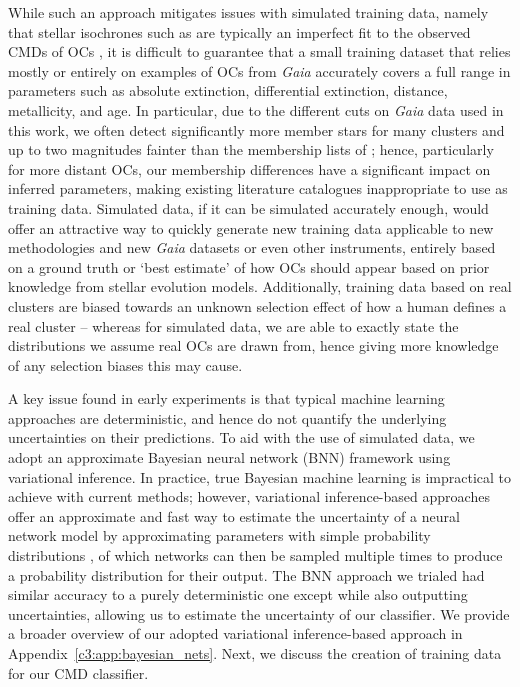 While such an approach mitigates issues with simulated training data, namely that stellar isochrones such as \cite{bressan_parsec_2012} are typically an imperfect fit to the observed CMDs of OCs \citep{cantat-gaudin_painting_2020}, it is difficult to guarantee that a small training dataset that relies mostly or entirely on examples of OCs from \emph{Gaia} accurately covers a full range in parameters such as absolute extinction, differential extinction, distance, metallicity, and age. In particular, due to the different cuts on \emph{Gaia} data used in this work, we often detect significantly more member stars for many clusters and up to two magnitudes fainter than the membership lists of \cite{cantat-gaudin_clusters_2020}; hence, particularly for more distant OCs, our membership differences have a significant impact on inferred parameters, making existing literature catalogues inappropriate to use as training data. Simulated data, if it can be simulated accurately enough, would offer an attractive way to quickly generate new training data applicable to new methodologies and new \emph{Gaia} datasets or even other instruments, entirely based on a ground truth or `best estimate' of how OCs should appear based on prior knowledge from stellar evolution models. Additionally, training data based on real clusters are biased towards an unknown selection effect of how a human defines a real cluster -- whereas for simulated data, we are able to exactly state the distributions we assume real OCs are drawn from, hence giving more knowledge of any selection biases this may cause.

A key issue found in early experiments is that typical machine learning approaches are deterministic, and hence do not quantify the underlying uncertainties on their predictions. To aid with the use of simulated data, we adopt an approximate Bayesian neural network (BNN) framework using variational inference. In practice, true Bayesian machine learning is impractical to achieve with current methods; however, variational inference-based approaches offer an approximate and fast way to estimate the uncertainty of a neural network model by approximating parameters with simple probability distributions \citep{goan_bayesian_2020, jospin_hands-bayesian_2022}, of which networks can then be sampled multiple times to produce a probability distribution for their output. The BNN approach we trialed had similar accuracy to a purely deterministic one except while also outputting uncertainties, allowing us to estimate the uncertainty of our classifier. We provide a broader overview of our adopted variational inference-based approach in Appendix~\ref{c3:app:bayesian_nets}. Next, we discuss the creation of training data for our CMD classifier.

